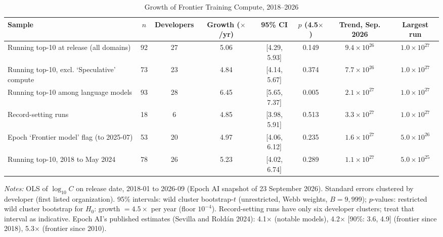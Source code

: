 \begin{table}[htbp]
\centering
\footnotesize
\caption{Growth of Frontier Training Compute, 2018--2026}
\label{tab:ra3_compute_growth}
\begin{tabular}{lccccccc}
\toprule
Sample & $n$ & Developers & Growth ($\times$/yr) & 95\% CI & $p$ (4.5$\times$) & Trend, Sep. 2026 & Largest run \\
\midrule
Running top-10 at release (all domains) & 92 & 27 & 5.06 & [4.29, 5.93] & 0.149 & $9.4\times10^{26}$ & $1.0\times10^{27}$ \\
Running top-10, excl. `Speculative' compute & 73 & 23 & 4.84 & [4.14, 5.67] & 0.374 & $7.7\times10^{26}$ & $1.0\times10^{27}$ \\
Running top-10 among language models & 93 & 28 & 6.45 & [5.65, 7.37] & 0.005 & $2.1\times10^{27}$ & $1.0\times10^{27}$ \\
Record-setting runs & 18 & 6 & 4.85 & [3.98, 5.91] & 0.513 & $3.3\times10^{27}$ & $1.0\times10^{27}$ \\
Epoch `Frontier model' flag (to 2025-07) & 53 & 20 & 4.97 & [4.06, 6.12] & 0.235 & $1.6\times10^{27}$ & $5.0\times10^{26}$ \\
Running top-10, 2018 to May 2024 & 78 & 26 & 5.23 & [4.02, 6.74] & 0.289 & $1.1\times10^{27}$ & $5.0\times10^{25}$ \\
\bottomrule
\end{tabular}
\begin{tablenotes}\footnotesize
\item \textit{Notes:} OLS of $\log_{10}C$ on release date, 2018-01 to 2026-09 (Epoch AI snapshot of 23 September 2026). Standard errors clustered by developer (first listed organization). 95\% intervals: wild cluster bootstrap-$t$ (unrestricted, Webb weights, $B=9{,}999$); $p$-values: restricted wild cluster bootstrap for $H_0$: growth $=4.5\times$ per year (floor $10^{-4}$). Record-setting runs have only six developer clusters; treat that interval as indicative. Epoch AI's published estimates (Sevilla and Rold\'an 2024): 4.1$\times$ (notable models), 4.2$\times$ [90\%: 3.6, 4.9] (frontier since 2018), 5.3$\times$ (frontier since 2010).
\end{tablenotes}
\end{table}
